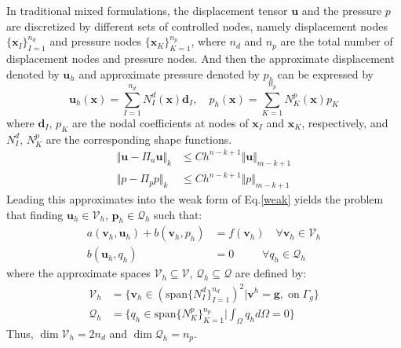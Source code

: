 In traditional mixed formulations, the displacement tensor $\boldsymbol u$ and the pressure $p$ are discretized by different sets of controlled nodes, namely displacement nodes $\{\boldsymbol x_I\}_{I=1}^{n_d}$ and pressure nodes $\{\boldsymbol x_K\}_{K=1}^{n_p}$, where $n_d$ and $n_p$ are the total number of displacement nodes and pressure nodes. And then the approximate displacement denoted by $\boldsymbol u_h$ and approximate pressure denoted by $p_h$ can be expressed by  
\begin{equation}\label{approx}
    \boldsymbol u_h(\boldsymbol x) = \sum_{I=1}^{n_d} N_I^d(\boldsymbol x) \boldsymbol d_I, \quad
    p_h(\boldsymbol x) = \sum_{K=1}^{n_p} N_K^p(\boldsymbol x) p_K
\end{equation}
where $\boldsymbol d_I$, $p_K$ are the nodal coefficients at nodes of $\boldsymbol x_I$ and $\boldsymbol x_K$, respectively, and $N_I^d$, $N_K^p$ are the corresponding shape functions.
\begin{align}
    \Vert \boldsymbol u - \Pi_u \boldsymbol u \Vert_k &\le Ch^{n-k+1} \Vert \boldsymbol u \Vert_{m-k+1} \\
    \Vert p - \Pi_p p \Vert_k &\le Ch^{n-k+1} \Vert p \Vert_{m-k+1}
\end{align}
Leading this approximates into the weak form of Eq.\eqref{weak} yields the problem that finding $\boldsymbol u_h \in \mathcal V_h$, $\boldsymbol p_h \in \mathcal Q_h$ such that:
\begin{equation}\label{approxweak}
    \begin{split}
        a(\boldsymbol v_h, \boldsymbol u_h) + b(\boldsymbol v_h, p_h) &= f(\boldsymbol v_h)  \quad \forall \boldsymbol v_h \in \mathcal V_h \\
        b(\boldsymbol u_h,q_h) &= 0 \qquad \;\; \forall q_h \in \mathcal Q_h
    \end{split}
\end{equation}
where the approximate spaces $\mathcal V_h \subseteq \mathcal V$, $\mathcal Q_h \subseteq \mathcal Q$ are defined by:
\begin{align}
    \mathcal V_h &= \{\boldsymbol v_h \in (\mathrm{span}\{N_I^d\}_{I=1}^{n_d})^2 \vert \boldsymbol v^h = \boldsymbol g,\; \mathrm{on} \; \Gamma_g\} \\
    \mathcal Q_h &= \{q_h \in \mathrm{span}\{N_K^p\}_{K=1}^{n_p} \vert \int_{\Omega} q_h d\Omega = 0\}
\end{align}
Thus, $\dim \mathcal V_h = 2n_d$ and $\dim \mathcal Q_h = n_p$.

